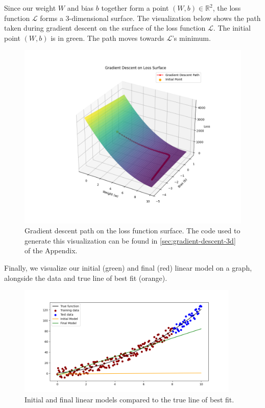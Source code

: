 Since our weight $W$ and bias $b$ together form a point $(W,b)\in\mathbb{R}^2$, the loss function $\mathcal{L}$ forms a 3-dimensional surface. The visualization below shows the path taken during gradient descent on the surface of the loss function $\mathcal{L}$. The initial point $(W,b)$ is in green. The path moves towards $\mathcal{L}$'s minimum. 

\begin{figure}[H]
\centering
\includegraphics[width=330pt]{Regression/code/gradient-descent-3d.png}
\caption{Gradient descent path on the loss function surface. The code used to generate this visualization can be found in \ref{sec:gradient-descent-3d} of the Appendix.}
\label{fig:linear5}
\end{figure}

Finally, we visualize our initial (green) and final (red) linear model on a graph, alongside the data and true line of best fit (orange). 

\begin{figure}[H]
\centering
\includegraphics[width=300pt]{Regression/code/final-model.png}
\caption{Initial and final linear models compared to the true line of best fit.}
\label{fig:linear6}
\end{figure}

